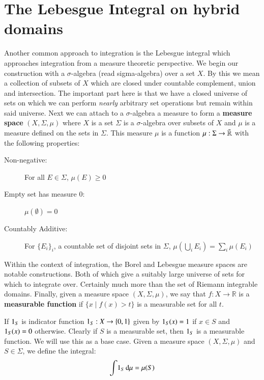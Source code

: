 \section{The Lebesgue Integral on hybrid domains}

Another common approach to integration is the Lebesgue integral which approaches integration from a measure theoretic
perspective.
We begin our construction with a $\sigma$-algebra (read sigma-algebra) over a set $X$.
By this we mean a collection of subsets of $X$ which are closed under countable complement, union and intersection.
The important part here is that we have a closed universe of sets on which we can perform 
\emph{nearly} arbitrary set operations but remain within said universe.
Next we can attach to a $\sigma$-algebra a measure to form a \textbf{measure space} $(X, \Sigma, \mu)$ 
where $X$ is a set $\Sigma$ is a $\sigma$-algebra  over subsets of $X$ and $\mu$ is a measure defined on the sets in
 $\Sigma$.
This measure $\mu$ is a function $\mu: \Sigma \to \bar{\mathbb{R}}$ with the following properties:
\begin{description}
	\item[Non-negative:] For all $E \in \Sigma$, $\mu(E) \geq 0$
	\item[Empty set has measure 0:] $\mu(\emptyset) = 0$
	\item[Countably Additive:] For $\{E_i\}_i$, a countable set of disjoint sets in $\Sigma$,
		$\mu \left( \bigcup_i E_i \right) = \sum_i \mu(E_i)$
\end{description}
Within the context of integration, the Borel and Lebesgue measure spaces are notable constructions.
Both of which give a suitably large universe of sets for which to integrate over.
Certainly much more than the set of Riemann integrable domains.
Finally, given a measure space $(X, \Sigma, \mu)$, we say that $f : X \to \mathbb{R}$ is a \textbf{measurable function}
if  $\{ x \; | \; f(x) > t\}$ is a measurable set for all $t$.



If $\ind[S]$ is indicator function $\ind[S] : X \to \{ 0, 1 \}$ given by 
$\ind[S] (x) = 1$ if $x \in S$ and $\ind[S] (x) = 0$ otherwise.
Clearly if $S$ is a measurable set, then $\ind[S]$ is a measurable function.
We will use this as a base case.
Given a measure space $(X, \Sigma, \mu)$ and $S \in \Sigma$, we define the integral:
\begin{equation}
	\int \! \ind[S] \diff \mu = \mu ( S )
\end{equation}



